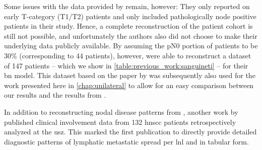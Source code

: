 \documentclass[\relativeRoot/main.tex]{subfiles}
\begin{document}
Some issues with the data provided by  remain, however: They only reported on early T-category (T1/T2) patients and only included pathologically node positive patients in their study. Hence, a complete reconstruction of the patient cohort is still not possible, and unfortunately the authors also did not choose to make their underlying data publicly available. By assuming the pN0 portion of patients to be 30\% (corresponding to 44 patients), however,  were able to reconstruct a dataset of 147 patients -- which we show in \cref{table:previous_work:sanguineti} -- for their \acrlong{bn} model. This dataset based on the paper by  was subsequently also used for the work presented here in \cref{chap:unilateral} to allow for an easy comparison between our results and the results from .

In addition to reconstructing nodal disease patterns from , another work by  published clinical involvement data from 132 \gls{hnscc} patients retrospectively analyzed at the \gls{usz}. This marked the first publication to directly provide detailed diagnostic patterns of lymphatic metastatic spread per \gls{lnl} and in tabular form.
\end{document}
